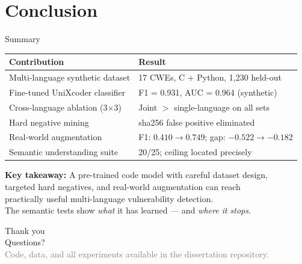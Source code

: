 \documentclass[aspectratio=169]{beamer}
\newcommand{\note}[1]{\textcolor{gray}{#1}}
\begin{document}
\section{Conclusion}

\begin{frame}{Summary}
  \begin{center}
    \begin{tabular}{ll}
      \toprule
      \textbf{Contribution} & \textbf{Result} \\
      \midrule
      Multi-language synthetic dataset & 17 CWEs, C + Python, 1{,}230 held-out \\
      Fine-tuned UniXcoder classifier  & F1 = 0.931, AUC = 0.964 (synthetic) \\
      Cross-language ablation (3$\times$3) & Joint $>$ single-language on all sets \\
      Hard negative mining             & sha256 false positive eliminated \\
      Real-world augmentation          & F1: $0.410 \to 0.749$; gap: $-0.522 \to -0.182$ \\
      Semantic understanding suite     & 20/25; ceiling located precisely \\
      \bottomrule
    \end{tabular}
  \end{center}

  \vspace{0.5em}
  \begin{center}
    \textbf{Key takeaway:} A pre-trained code model with careful dataset design,\\
    targeted hard negatives, and real-world augmentation can reach\\
    practically useful multi-language vulnerability detection.\\
    The semantic tests show \emph{what} it has learned --- and \emph{where it stops}.
  \end{center}
\end{frame}

\begin{frame}[plain]
  \begin{center}
    \vspace{2cm}
    {\Large Thank you}\\[1cm]
    {\large Questions?}\\[2cm]
    \note{Code, data, and all experiments available in the dissertation repository.}
  \end{center}
\end{frame}
\end{document}
